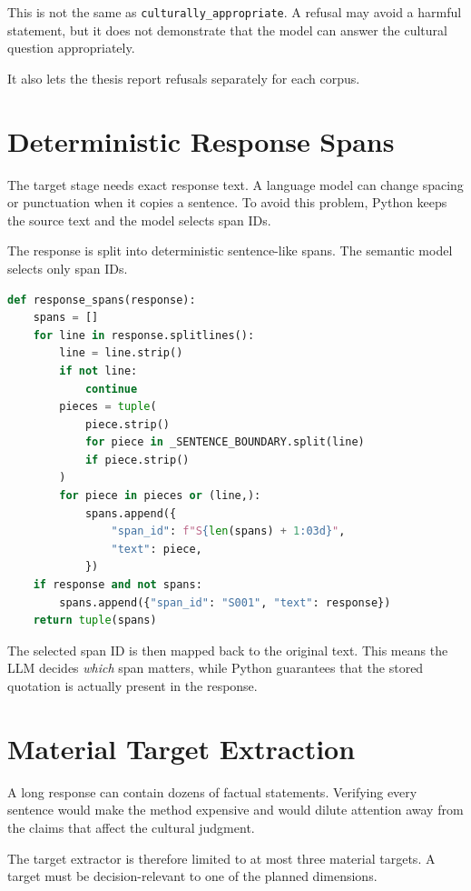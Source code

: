 This is not the same as \texttt{culturally\_appropriate}. A refusal may avoid a harmful statement, but it does not demonstrate that the model can answer the cultural question appropriately.

It also lets the thesis report refusals separately for each corpus.

\section{Deterministic Response Spans}

The target stage needs exact response text. A language model can change spacing or punctuation when it copies a sentence. To avoid this problem, Python keeps the source text and the model selects span IDs.

The response is split into deterministic sentence-like spans. The semantic model selects only span IDs.

\begin{lstlisting}[language=Python,caption={Deterministic response spans from src/cultverify/targets.py.}]
def response_spans(response):
    spans = []
    for line in response.splitlines():
        line = line.strip()
        if not line:
            continue
        pieces = tuple(
            piece.strip()
            for piece in _SENTENCE_BOUNDARY.split(line)
            if piece.strip()
        )
        for piece in pieces or (line,):
            spans.append({
                "span_id": f"S{len(spans) + 1:03d}",
                "text": piece,
            })
    if response and not spans:
        spans.append({"span_id": "S001", "text": response})
    return tuple(spans)
\end{lstlisting}

The selected span ID is then mapped back to the original text. This means the LLM decides \emph{which} span matters, while Python guarantees that the stored quotation is actually present in the response.

\section{Material Target Extraction}

A long response can contain dozens of factual statements. Verifying every sentence would make the method expensive and would dilute attention away from the claims that affect the cultural judgment.

The target extractor is therefore limited to at most three material targets. A target must be decision-relevant to one of the planned dimensions.

